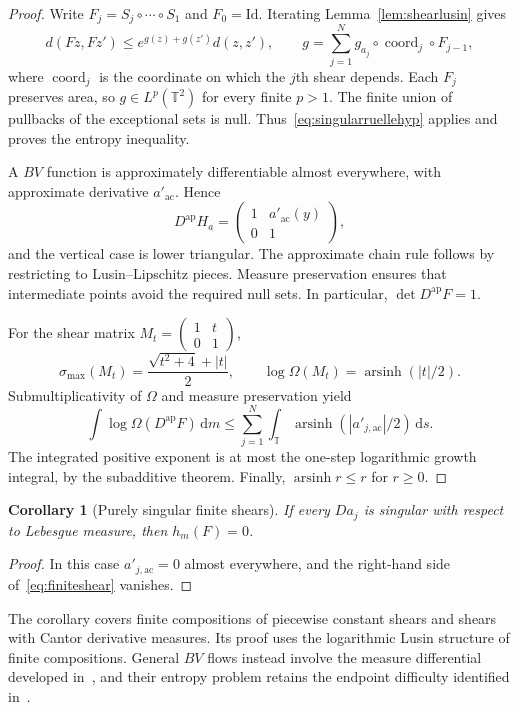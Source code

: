\documentclass[review,12pt,times,a4paper,nopreprintline]{elsarticle}
\theoremstyle{plain}
\newtheorem{corollary}[theorem]{Corollary}
\theoremstyle{definition}
\theoremstyle{remark}
\newcommand{\T}{\mathbb T}
\newcommand{\Id}{\mathrm{Id}}
\newcommand{\dd}{\,\mathrm d}
\newcommand{\arsinh}{\operatorname{arsinh}}
\newcommand{\ap}{\operatorname{ap}}
\numberwithin{equation}{section}
\begin{document}
\begin{proof}
Write $F_j=S_j\circ\cdots\circ S_1$ and $F_0=\Id$. Iterating Lemma~\ref{lem:shearlusin} gives
\[
 d(Fz,Fz')\leq e^{g(z)+g(z')}d(z,z'),\qquad
 g=\sum_{j=1}^Ng_{a_j}\circ\operatorname{coord}_j\circ F_{j-1},
\]
where $\operatorname{coord}_j$ is the coordinate on which the $j$th shear depends. Each $F_j$ preserves area, so $g\in L^p(\T^2)$ for every finite $p>1$. The finite union of pullbacks of the exceptional sets is null. Thus~\eqref{eq:singularruellehyp} applies and proves the entropy inequality.

A $BV$ function is approximately differentiable almost everywhere, with approximate derivative $a'_{\mathrm{ac}}$. Hence
\[
 D^{\ap}H_a=\begin{pmatrix}1&a'_{\mathrm{ac}}(y)\\0&1\end{pmatrix},
\]
and the vertical case is lower triangular. The approximate chain rule follows by restricting to Lusin--Lipschitz pieces. Measure preservation ensures that intermediate points avoid the required null sets. In particular, $\det D^{\ap}F=1$.

For the shear matrix $M_t=\left(\begin{smallmatrix}1&t\\0&1\end{smallmatrix}\right)$,
\[
 \sigma_{\max}(M_t)=\frac{\sqrt{t^2+4}+|t|}{2},\qquad
 \log\Omega(M_t)=\arsinh(|t|/2).
\]
Submultiplicativity of $\Omega$ and measure preservation yield
\[
 \int\log\Omega(D^{\ap}F)\dd m
 \leq\sum_{j=1}^N\int_{\T}\arsinh(|a'_{j,\mathrm{ac}}|/2)\dd s.
\]
The integrated positive exponent is at most the one-step logarithmic growth integral, by the subadditive theorem. Finally, $\arsinh r\leq r$ for $r\geq0$.
\end{proof}

\begin{corollary}[Purely singular finite shears]\label{cor:puresingular}
If every $Da_j$ is singular with respect to Lebesgue measure, then $h_m(F)=0$.
\end{corollary}
\begin{proof}
In this case $a'_{j,\mathrm{ac}}=0$ almost everywhere, and the right-hand side of~\eqref{eq:finiteshear} vanishes.
\end{proof}
The corollary covers finite compositions of piecewise constant shears and shears with Cantor derivative measures. Its proof uses the logarithmic Lusin structure of finite compositions. General $BV$ flows instead involve the measure differential developed in~\cite{BianchiniDeNitti}, and their entropy problem retains the endpoint difficulty identified in~\cite{BCJ}.
\end{document}
